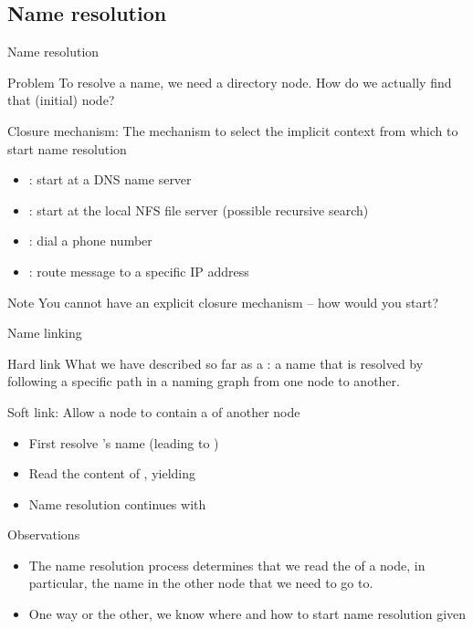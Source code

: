 \subsection{Name resolution}
\begin{slide}{Name resolution}
  \begin{alertblock}{Problem}
    To resolve a name, we need a directory node. How do we actually find that (initial) node?
  \end{alertblock}
  \onslide
  \begin{block}{Closure mechanism: The mechanism to select the implicit context from which to start name
      resolution}
    \begin{itemize}\tightlist
    \item {}: start at a DNS name server
    \item {}: start at the local NFS file server (possible recursive search)
    \item {}: dial a phone number
    \item {}: route message to a specific IP address
    \end{itemize}
  \end{block}
  \onslide
  \begin{block}{Note}
    You cannot have an explicit closure mechanism -- how would you start?
  \end{block}
\end{slide}
\begin{slide}{Name linking}
  \begin{block}{Hard link} 
    What we have described so far as a : a name that is resolved by following a specific path
    in a naming graph from one node to another.
  \end{block}
  \begin{block}{Soft link: Allow a node  to contain a  of another node}
    \begin{itemize}\tightlist
    \item First resolve 's name (leading to )
    \item Read the content of , yielding 
    \item Name resolution continues with 
    \end{itemize}
  \end{block}
  \onslide
  \begin{block}{Observations}
    \begin{itemize}\tightlist
    \item The name resolution process determines that we read the  of a node, in particular, the
      name in the other node that we need to go to.
    \item One way or the other, we know where and how to start name resolution given 
    \end{itemize}
  \end{block}
\end{slide}
